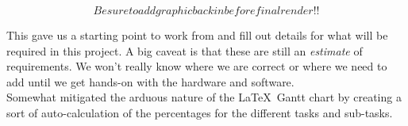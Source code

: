 \documentclass[compsoc,draftclsnofoot,onecolumn,10pt]{IEEEtran}
\begin{document}
\begin{itemize}
			\[Be sure to add graphic back in before final render!!\]            

            This gave us a starting point to work from and fill out details for
            what will be required in this project. A big caveat is that these
            are still an \textit{estimate} of requirements. We won't really know
            where we are correct or where we need to add until we get hands-on
            with the hardware and software.\\
            Somewhat mitigated the arduous nature of the \LaTeX~Gantt chart by
            creating a sort of auto-calculation of the percentages for the
            different tasks and sub-tasks.

	\end{itemize}
   
\end{document}

